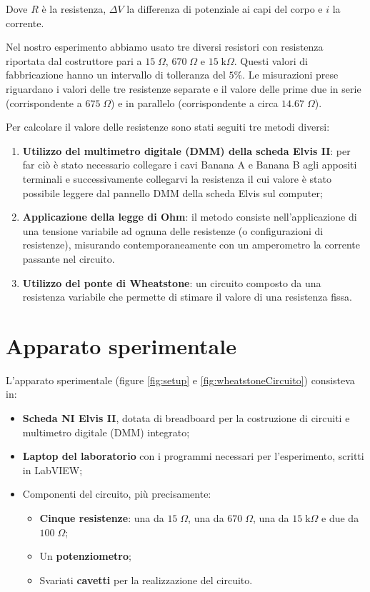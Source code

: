 \documentclass[11pt]{article}
\begin{document}
Dove $R$ è la resistenza, $\Delta V$ la differenza di potenziale ai capi del corpo e $i$ la corrente.

Nel nostro esperimento abbiamo usato tre diversi resistori con resistenza riportata dal costruttore 
pari a $15 \; \Omega$, $670 \; \Omega$ e $15 \; \text{k}\Omega$. Questi valori di fabbricazione hanno 
un intervallo di tolleranza del $5\%$. Le misurazioni prese riguardano i valori delle tre resistenze 
separate e il valore delle prime due in serie (corrispondente a $675 \; \Omega$) e in parallelo (corrispondente a circa $14.67 \; \Omega$).

Per calcolare il valore delle resistenze sono stati seguiti tre metodi diversi:

\begin{enumerate}
    \item \textbf{Utilizzo del multimetro digitale (DMM) della scheda Elvis II}: per far ciò è stato necessario collegare i cavi Banana A e Banana B agli appositi terminali e successivamente collegarvi la resistenza il cui valore è stato possibile leggere dal pannello DMM della scheda Elvis sul computer;
    \item \textbf{Applicazione della legge di Ohm}: il metodo consiste nell’applicazione di una tensione variabile ad ognuna delle resistenze (o configurazioni di resistenze), misurando contemporaneamente con un amperometro la corrente passante nel circuito. 
    \item \textbf{Utilizzo del ponte di Wheatstone}: un circuito composto da una resistenza variabile che permette di stimare il valore di una resistenza fissa.
\end{enumerate}


\section{Apparato sperimentale}
L'apparato sperimentale (figure \ref{fig:setup} e \ref{fig:wheatstoneCircuito}) consisteva in:
\begin{itemize}
    \item \textbf{Scheda NI Elvis II}, dotata di breadboard per la costruzione di circuiti e multimetro digitale (DMM) integrato;
        \item \textbf{Laptop del laboratorio} con i programmi necessari per l'esperimento, scritti in LabVIEW;
        \item Componenti del circuito, più precisamente:
        \begin{itemize}
            \item \textbf{Cinque resistenze}: una da $15 \; \Omega$, una da $670 \; \Omega$, una da $15 \; \text{k}\Omega$ e due da $100 \; \Omega$;
            \item Un \textbf{potenziometro};
            \item Svariati \textbf{cavetti} per la realizzazione del circuito.
        \end{itemize}
\end{itemize}
\end{document}
